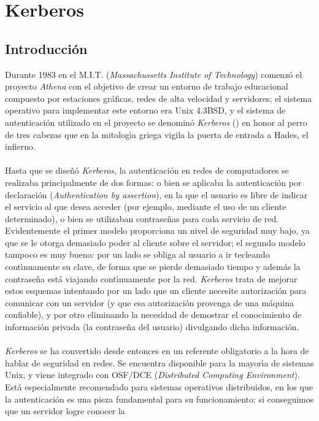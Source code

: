 \chapter{Kerberos} 
\section{Introducci\'on}
Durante 1983 en el M.I.T. ({\it Massachussetts Institute of Technology}) 
comenz\'o el proyecto {\it Athena} con el objetivo de crear un entorno de
trabajo educacional compuesto por estaciones gr\'aficas, redes de alta velocidad
y servidores; el sistema operativo para implementar este entorno era Unix 
4.3BSD, y el sistema de autenticaci\'on utilizado en el proyecto se denomin\'o 
{\it Kerberos} (\cite{kn:mil87}) en honor al perro de tres cabezas que en la 
mitolog\'{\i}a griega vigila la puerta de entrada a Hades, el infierno.\\
\\Hasta que se dise\~n\'o {\it Kerberos}, la autenticaci\'on en redes de 
computadores se realizaba principalmente de dos formas: o bien se aplicaba la
autenticaci\'on por declaraci\'on ({\it Authentication by assertion}), en la que
el usuario es libre de indicar el servicio al que desea acceder (por ejemplo,
mediante el uso de un cliente determinado), o bien se utilizaban contrase\~nas
para cada servicio de red. Evidentemente el primer modelo proporciona un nivel
de seguridad muy bajo, ya que se le otorga demasiado poder al cliente sobre el
servidor; el segundo modelo tampoco es muy bueno: por un lado se obliga al
usuario a ir tecleando cont\'{\i}nuamente su clave, de forma que se pierde 
demasiado tiempo y adem\'as la contrase\~na est\'a viajando cont\'{\i}nuamente
por la red. {\it Kerberos} trata de mejorar estos esquemas intentando por un
lado que un cliente necesite autorizaci\'on para comunicar con un servidor
(y que esa autorizaci\'on provenga de una m\'aquina confiable), y por otro
eliminando la necesidad de demostrar el conocimiento de informaci\'on privada
(la contrase\~na del usuario) divulgando dicha informaci\'on.\\
\\{\it Kerberos} se ha convertido desde entonces en un referente obligatorio a
la hora de hablar de seguridad en redes. Se encuentra disponible para la 
mayor\'{\i}a de sistemas Unix, y viene integrado con OSF/DCE ({\it Distributed 
Computing Environment}). Est\'a especialmente recomendado para sistemas 
operativos distribuidos, en los que la autenticaci\'on es una pieza fundamental 
para su funcionamiento: si conseguimos que un servidor logre conocer la 
